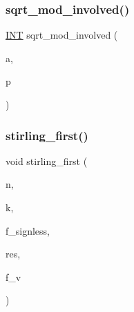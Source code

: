 \mbox{\label{global_8_c_acd861d9b44d7703f6f8bf7fd75b9afe6}} 
\subsubsection{\texorpdfstring{sqrt\+\_\+mod\+\_\+involved()}{sqrt\_mod\_involved()}}
{\footnotesize\ttfamily \mbox{\hyperlink{galois_8h_a09fddde158a3a20bd2dcadb609de11dc}{I\+NT}} sqrt\+\_\+mod\+\_\+involved (\begin{DoxyParamCaption}\item[{\mbox{\hyperlink{galois_8h_a09fddde158a3a20bd2dcadb609de11dc}{I\+NT}}}]{a,  }\item[{\mbox{\hyperlink{galois_8h_a09fddde158a3a20bd2dcadb609de11dc}{I\+NT}}}]{p }\end{DoxyParamCaption})}

\mbox{\label{global_8_c_adb2788e2fccfe63b84d5c2d118c07b5f}} 
\subsubsection{\texorpdfstring{stirling\+\_\+first()}{stirling\_first()}}
{\footnotesize\ttfamily void stirling\+\_\+first (\begin{DoxyParamCaption}\item[{\mbox{\hyperlink{galois_8h_a09fddde158a3a20bd2dcadb609de11dc}{I\+NT}}}]{n,  }\item[{\mbox{\hyperlink{galois_8h_a09fddde158a3a20bd2dcadb609de11dc}{I\+NT}}}]{k,  }\item[{\mbox{\hyperlink{galois_8h_a09fddde158a3a20bd2dcadb609de11dc}{I\+NT}}}]{f\+\_\+signless,  }\item[{\mbox{\hyperlink{classdiscreta__base}{discreta\+\_\+base}} \&}]{res,  }\item[{\mbox{\hyperlink{galois_8h_a09fddde158a3a20bd2dcadb609de11dc}{I\+NT}}}]{f\+\_\+v }\end{DoxyParamCaption})}

\mbox{\label{global_8_c_a97414d48b4630aa231d26a78ae3158af}} 
